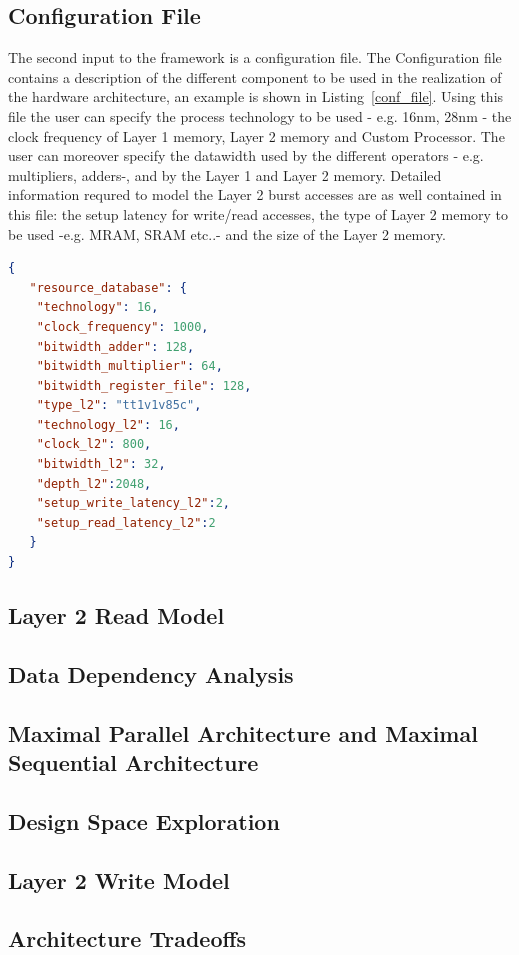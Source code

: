 \subsection{Configuration File}
The second input to the framework is a configuration file. The Configuration file contains a description of the different component to be used in the realization of the hardware architecture, an example is shown in Listing~\ref{conf_file}. Using this file the user can specify the process technology to be used - e.g. 16nm, 28nm - the clock frequency of Layer 1 memory, Layer 2 memory and Custom Processor. The user can moreover specify the datawidth used by the different operators - e.g. multipliers, adders-, and by the Layer 1 and Layer 2 memory. 
Detailed information requred to model the Layer 2 burst accesses are as well contained in this file: the setup latency for write/read accesses, the type of Layer 2 memory to be used -e.g. MRAM, SRAM etc..- and the size of the Layer 2 memory.
\begin{lstlisting}[language=json, caption={Example of input configuration file}, label={lst:conf_file}]
{ 
   "resource_database": { 
	"technology": 16, 
	"clock_frequency": 1000, 
	"bitwidth_adder": 128, 
	"bitwidth_multiplier": 64, 
	"bitwidth_register_file": 128, 
	"type_l2": "tt1v1v85c", 
	"technology_l2": 16, 
	"clock_l2": 800, 
	"bitwidth_l2": 32, 
	"depth_l2":2048, 
	"setup_write_latency_l2":2, 
	"setup_read_latency_l2":2 
   } 
}

\end{lstlisting}

\subsection{Layer 2 Read Model}
\subsection{Data Dependency Analysis}
\subsection{Maximal Parallel Architecture and Maximal Sequential Architecture}
\subsection{Design Space Exploration}
\subsection{Layer 2 Write Model}
\subsection{Architecture Tradeoffs}


